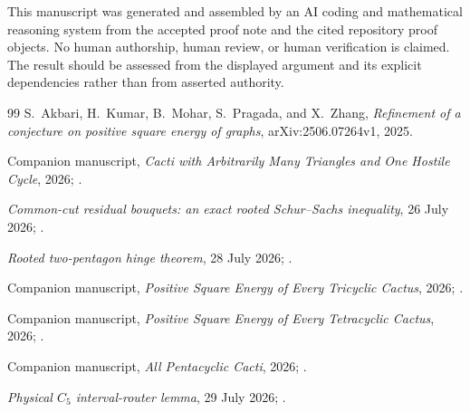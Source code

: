 \documentclass[11pt]{article}
\theoremstyle{remark}
\begin{document}
This manuscript was generated and assembled by an AI coding and mathematical
reasoning system from the accepted proof note and the cited repository proof
objects.  No human authorship, human review, or human verification is claimed.
The result should be assessed from the displayed argument and its explicit
dependencies rather than from asserted authority.

\begin{thebibliography}{99}
S.~Akbari, H.~Kumar, B.~Mohar, S.~Pragada, and X.~Zhang,
\emph{Refinement of a conjecture on positive square energy of graphs},
arXiv:2506.07264v1, 2025.

Companion manuscript, \emph{Cacti with Arbitrarily Many Triangles and One
Hostile Cycle}, 2026;
.

\emph{Common-cut residual bouquets: an exact rooted Schur--Sachs inequality},
26 July 2026;
.

\emph{Rooted two-pentagon hinge theorem}, 28 July 2026;
.

Companion manuscript, \emph{Positive Square Energy of Every Tricyclic Cactus},
2026; .

Companion manuscript, \emph{Positive Square Energy of Every Tetracyclic
Cactus}, 2026; .

Companion manuscript, \emph{All Pentacyclic Cacti}, 2026;
.

\emph{Physical $C_5$ interval-router lemma}, 29 July 2026;
.
\end{thebibliography}
\end{document}
